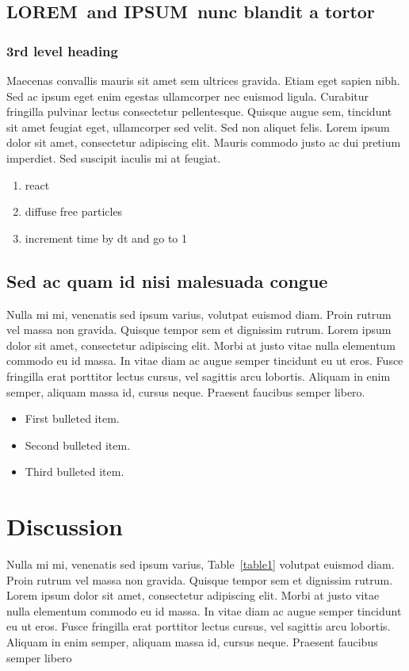 \documentclass[10pt,letterpaper]{article}
\newcommand{\lorem}{{\bf LOREM}}
\newcommand{\ipsum}{{\bf IPSUM}}
\begin{document}
\subsection*{\lorem\ and \ipsum\ nunc blandit a tortor}
\subsubsection*{3rd level heading} 
Maecenas convallis mauris sit amet sem ultrices gravida. Etiam eget sapien nibh. Sed ac ipsum eget enim egestas ullamcorper nec euismod ligula. Curabitur fringilla pulvinar lectus consectetur pellentesque. Quisque augue sem, tincidunt sit amet feugiat eget, ullamcorper sed velit. Sed non aliquet felis. Lorem ipsum dolor sit amet, consectetur adipiscing elit. Mauris commodo justo ac dui pretium imperdiet. Sed suscipit iaculis mi at feugiat. 

\begin{enumerate}
	\item{react}
	\item{diffuse free particles}
	\item{increment time by dt and go to 1}
\end{enumerate}


\subsection*{Sed ac quam id nisi malesuada congue}

Nulla mi mi, venenatis sed ipsum varius, volutpat euismod diam. Proin rutrum vel massa non gravida. Quisque tempor sem et dignissim rutrum. Lorem ipsum dolor sit amet, consectetur adipiscing elit. Morbi at justo vitae nulla elementum commodo eu id massa. In vitae diam ac augue semper tincidunt eu ut eros. Fusce fringilla erat porttitor lectus cursus, vel sagittis arcu lobortis. Aliquam in enim semper, aliquam massa id, cursus neque. Praesent faucibus semper libero.

\begin{itemize}
	\item First bulleted item.
	\item Second bulleted item.
	\item Third bulleted item.
\end{itemize}

\section*{Discussion}
Nulla mi mi, venenatis sed ipsum varius, Table~\ref{table1} volutpat euismod diam. Proin rutrum vel massa non gravida. Quisque tempor sem et dignissim rutrum. Lorem ipsum dolor sit amet, consectetur adipiscing elit. Morbi at justo vitae nulla elementum commodo eu id massa. In vitae diam ac augue semper tincidunt eu ut eros. Fusce fringilla erat porttitor lectus cursus, vel sagittis arcu lobortis. Aliquam in enim semper, aliquam massa id, cursus neque. Praesent faucibus semper libero  %
\end{document}
